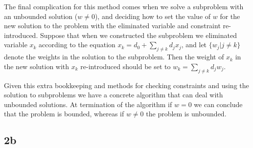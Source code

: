 \documentclass{article}
\begin{document}
The final complication for this method comes when we solve a subproblem with an
unbounded solution ($w \neq 0$), and deciding how to set the value of $w$ for the
new solution to the problem with the eliminated variable and constraint re-introduced.
Suppose that when we constructed the subproblem we eliminated variable $x_k$
according to the equation $x_k = d_0 + \sum_{j \neq k}{d_j x_j}$, and let
$\{w_j | j \neq k\}$ denote the weights in the solution to the subproblem.
Then the weight of $x_k$ in the new solution with $x_k$ re-introduced should
be set to $w_k = \sum_{j \neq k}{d_j w_j}$.

Given this extra bookkeeping and methods for checking constraints and using
the solution to subproblems we have a concrete algorithm that can deal with
unbounded solutions. At termination of the algorithm if $w = 0$ we can conclude
that the problem is bounded, whereas if $w \neq 0$ the problem is unbounded.


\subsection*{2b}
\end{document}

